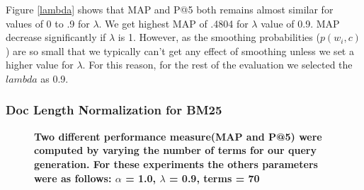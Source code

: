 \documentclass[article]{IEEEtran}
\begin{document}
Figure \ref{lambda} shows that MAP and P@5 both remains almost similar for values of 0 to .9 for $\lambda$. We get highest MAP of .4804 for $\lambda$ value of 0.9. MAP decrease significantly if $\lambda$ is 1. However, as the smoothing probabilities ($p(w_i,c)$) are so small that we typically can't get any effect of smoothing unless we set a higher value for $\lambda$. For this reason, for the rest of the evaluation we selected the $lambda$ as 0.9.

\subsubsection{Doc Length Normalization for BM25}
\begin{figure}[!ht]
\centering
\captionsetup{justification=centering}
{ \hfil 
{}} \caption{\textbf{Two different performance measure(MAP and P@5) were computed by varying the number of terms for our query generation. For these experiments the others parameters were as follows: $\alpha$ = 1.0, $\lambda$ = 0.9, terms = 70}} \label{b-perf}
\end{figure}
\end{document}
